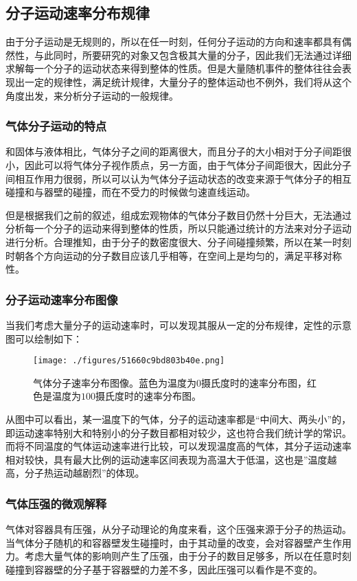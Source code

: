 \subsection{分子运动速率分布规律}
由于分子运动是无规则的，所以在任一时刻，任何分子运动的方向和速率都具有偶然性，与此同时，所要研究的对象又包含极其大量的分子，因此我们无法通过详细求解每一个分子的运动状态来得到整体的性质。但是大量随机事件的整体往往会表现出一定的规律性，满足统计规律，大量分子的整体运动也不例外，我们将从这个角度出发，来分析分子运动的一般规律。

\subsubsection{气体分子运动的特点}
和固体与液体相比，气体分子之间的距离很大，而且分子的大小相对于分子间距很小，因此可以将气体分子视作质点，另一方面，由于气体分子间距很大，因此分子间相互作用力很弱，所以可以认为气体分子运动状态的改变来源于气体分子的相互碰撞和与器壁的碰撞，而在不受力的时候做匀速直线运动。

但是根据我们之前的叙述，组成宏观物体的气体分子数目仍然十分巨大，无法通过分析每一个分子的运动来得到整体的性质，所以只能通过统计的方法来对分子运动进行分析。合理推知，由于分子的数密度很大、分子间碰撞频繁，所以在某一时刻时朝各个方向运动的分子数目应该几乎相等，在空间上是均匀的，满足平移对称性。

\subsubsection{分子运动速率分布图像}
当我们考虑大量分子的运动速率时，可以发现其服从一定的分布规律，定性的示意图可以绘制如下：
\begin{figure}[ht]
\centering
\texttt{[image: ./figures/51660c9bd803b40e.png]}
\caption{气体分子速率分布图像。蓝色为温度为$0$摄氏度时的速率分布图，红色是温度为$100$摄氏度时的速率分布图。} \label{fig_thermo_maxwell}
\end{figure}
从图中可以看出，某一温度下的气体，分子的运动速率都是“中间大、两头小”的，即运动速率特别大和特别小的分子数目都相对较少，这也符合我们统计学的常识。而将不同温度的气体运动速率进行比较，可以发现温度高的气体，其分子运动速率相对较快，具有最大比例的运动速率区间表现为高温大于低温，这也是”温度越高，分子热运动越剧烈”的体现。
\subsubsection{气体压强的微观解释}
气体对容器具有压强，从分子动理论的角度来看，这个压强来源于分子的热运动。当气体分子随机的和容器壁发生碰撞时，由于其动量的改变，会对容器壁产生作用力。考虑大量气体的影响则产生了压强，由于分子的数目足够多，所以在任意时刻碰撞到容器壁的分子基于容器壁的力差不多，因此压强可以看作是不变的。

